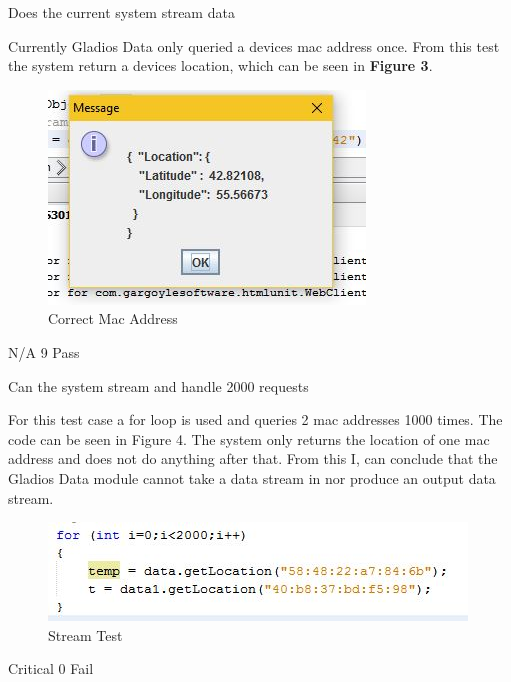 {Does the current system stream data}
{Currently Gladios Data only queried a devices mac address once. From this test the system return a devices location, which can be seen in \textbf{Figure 3}.
		\begin{figure}[h]
			\centering
			\includegraphics{right_mac.jpg}
			\caption{Correct Mac Address}
			\label{fig:right_mac}
		\end{figure} 
}
{N/A}
{9}	
{Pass}	
	
{Can the system stream and handle 2000 requests} 
{For this test case a for loop is used and queries 2 mac addresses 1000 times. The code can be seen in Figure 4. The system only returns the location of one mac address and does not do anything after that. From this I, can conclude that the Gladios Data module cannot take a data stream in nor produce an output data stream.
	\begin{figure}[h]
		\centering
		\includegraphics{stream_test.jpg}
		\caption{Stream Test}
		\label{fig:Output}
	\end{figure} 
}
{Critical}
{0}
{Fail}	


